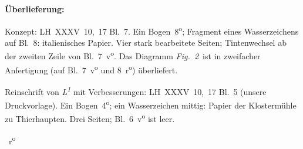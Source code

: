 %
%
%
%
%
%
\frenchspacing%
%
\begin{ledgroupsized}[r]{120mm}
\footnotesize
\pstart
\noindent
\textbf{Überlieferung:}
\pend
\end{ledgroupsized}
%
\begin{ledgroupsized}[r]{114mm}
\footnotesize
\pstart
\parindent -6mm
%
Konzept:
LH~XXXV~10,~17 Bl.~7. %
Ein Bogen~8\textsuperscript{o};
Fragment eines Wasserzeichens auf Bl.~8:
italienisches Papier.
Vier stark bearbeitete Seiten;
Tintenwechsel ab der zweiten Zeile von Bl.~7~v\textsuperscript{o}.
Das Diagramm \lbrack\textit{Fig.~2}\rbrack\ ist in zweifacher Anfertigung (auf Bl.~7~v\textsuperscript{o} und 8~r\textsuperscript{o}) überliefert.
\pend
\end{ledgroupsized}
%
\begin{ledgroupsized}[r]{114mm}
\footnotesize
\pstart
\parindent -6mm
%
Reinschrift von \textit{L\textsuperscript{1}} mit Verbesserungen:
LH~XXXV~10,~17 Bl.~5 %
(unsere Druckvorlage).
Ein Bogen~4\textsuperscript{o};
ein Wasserzeichen mittig:
Papier der Klostermühle zu Thierhaupten.
Drei Seiten;
Bl.~6~v\textsuperscript{o} ist leer.
\pend
\end{ledgroupsized}
%
%
\frenchspacing%
%
%
%
\count{}
\count{}
\count{}
%
%
%
\vspace{8mm}%
\pstart%
\normalsize%
\noindent%
%
~r\textsuperscript{o}\rbrack\ %
%
%
